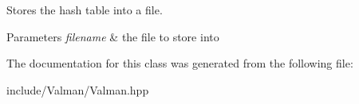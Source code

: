 Stores the hash table into a file. 


\begin{DoxyParams}{Parameters}
{\em filename} & the file to store into \\
\hline
\end{DoxyParams}


The documentation for this class was generated from the following file\-:\begin{DoxyCompactItemize}
\item 
include/\-Valman/Valman.\-hpp\end{DoxyCompactItemize}
